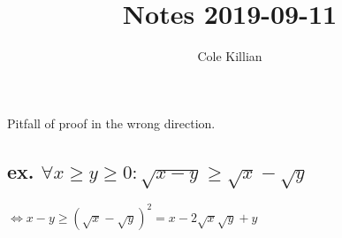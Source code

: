 \documentclass[class=scrartcl, crop=false]{standalone}
\begin{document}
\title{Notes 2019-09-11}
\author{Cole Killian}


Pitfall of proof in the wrong direction.

\subsection{ex. $\forall x \geq y \geq 0: \sqrt{x - y} \geq \sqrt{x} - \sqrt{y}$}

$\Leftrightarrow x - y \geq (\sqrt{x} - \sqrt{y})^2 = x-2 \sqrt{x} \sqrt{y} + y$
\end{document}
